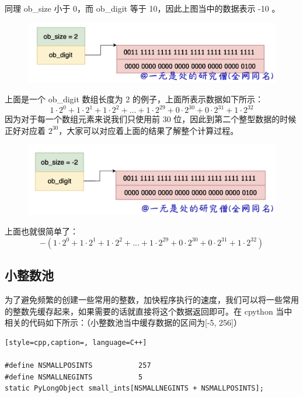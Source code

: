 同理 ob\_size 小于 0，而 ob\_digit 等于 10，因此上图当中的数据表示 -10 。

    \begin{figure}[H]
        \centering
            \includegraphics[scale=.3]{images/18-int.png}
            \caption{ }
        \label{fig:my_label}
    \end{figure}
    
上面是一个 ob\_digit 数组长度为 2 的例子，上面所表示数据如下所示：
$$
1 \cdot2^0 + 1 \cdot2^1 + 1 \cdot2^2 + ... + 1 \cdot2^{29} + 0 \cdot2^{30} + 0 \cdot2^{31} + 1 \cdot2^{32}
$$
因为对于每一个数组元素来说我们只使用前 30 位，因此到第二个整型数据的时候正好对应着 $2^{30}$，大家可以对应着上面的结果了解整个计算过程。

    \begin{figure}[H]
        \centering
            \includegraphics[scale=.3]{images/19-int.png}
            \caption{ }
        \label{fig:my_label}
    \end{figure}
    
上面也就很简单了：
$$
-(1 \cdot2^0 + 1 \cdot2^1 + 1 \cdot2^2 + ... + 1 \cdot2^{29} + 0 \cdot2^{30} + 0 \cdot2^{31} + 1 \cdot2^{32})
$$
\subsection{小整数池}
为了避免频繁的创建一些常用的整数，加快程序执行的速度，我们可以将一些常用的整数先缓存起来，如果需要的话就直接将这个数据返回即可。在 cpython 当中相关的代码如下所示：（小整数池当中缓存数据的区间为[-5, 256]）
\begin{lstlisting}[style=cpp,caption=, language=C++]

#define NSMALLPOSINTS           257
#define NSMALLNEGINTS           5
static PyLongObject small_ints[NSMALLNEGINTS + NSMALLPOSINTS];
\end{lstlisting}

